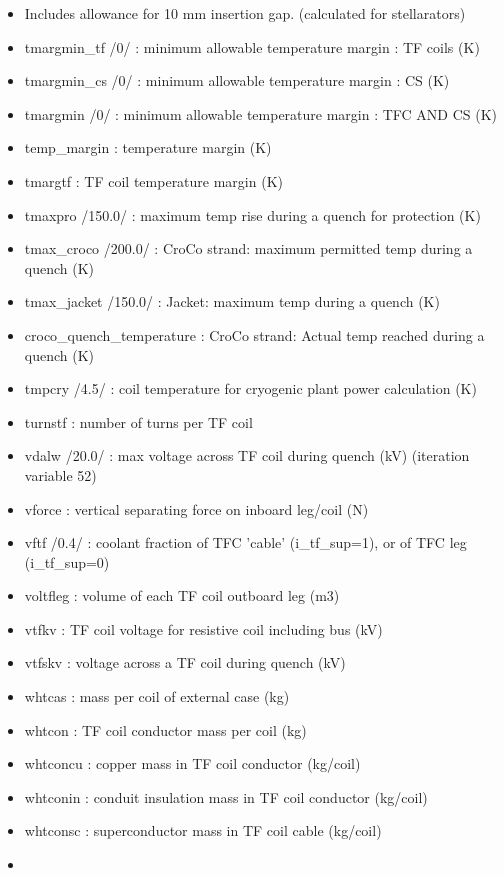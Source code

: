 \documentclass[]{article}
\begin{document}
\begin{itemize}
  (m)
\item
  Includes allowance for 10 mm insertion gap. (calculated for
  stellarators)
\item
  tmargmin\_tf /0/ : minimum allowable temperature margin : TF coils (K)
\item
  tmargmin\_cs /0/ : minimum allowable temperature margin : CS (K)
\item
  tmargmin /0/ : minimum allowable temperature margin : TFC AND CS (K)
\item
  temp\_margin : temperature margin (K)
\item
  tmargtf : TF coil temperature margin (K)
\item
  tmaxpro /150.0/ : maximum temp rise during a quench for protection (K)
\item
  tmax\_croco /200.0/ : CroCo strand: maximum permitted temp during a
  quench (K)
\item
  tmax\_jacket /150.0/ : Jacket: maximum temp during a quench (K)
\item
  croco\_quench\_temperature : CroCo strand: Actual temp reached during
  a quench (K)
\item
  tmpcry /4.5/ : coil temperature for cryogenic plant power calculation
  (K)
\item
  turnstf : number of turns per TF coil
\item
  vdalw /20.0/ : max voltage across TF coil during quench (kV)
  (iteration variable 52)
\item
  vforce : vertical separating force on inboard leg/coil (N)
\item
  vftf /0.4/ : coolant fraction of TFC 'cable' (i_tf_sup=1), or of TFC leg
  (i_tf_sup=0)
\item
  voltfleg : volume of each TF coil outboard leg (m3)
\item
  vtfkv : TF coil voltage for resistive coil including bus (kV)
\item
  vtfskv : voltage across a TF coil during quench (kV)
\item
  whtcas : mass per coil of external case (kg)
\item
  whtcon : TF coil conductor mass per coil (kg)
\item
  whtconcu : copper mass in TF coil conductor (kg/coil)
\item
  whtconin : conduit insulation mass in TF coil conductor (kg/coil)
\item
  whtconsc : superconductor mass in TF coil cable (kg/coil)
\item

\end{itemize}
\end{document}
